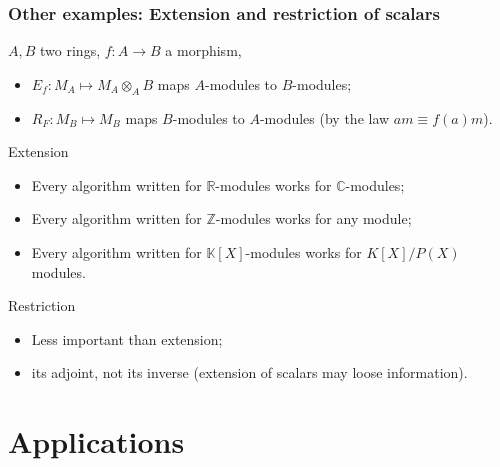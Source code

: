 \documentclass[10pt]{beamer}
\newcommand{\Z}{\mathbb{Z}}
\newcommand{\Complex}{\mathbb{C}}
\newcommand{\R}{\mathbb{R}}
\newcommand{\K}{\mathbb{K}}
\newcommand{\ra}{\rightarrow}
\begin{document}
\begin{frame}
  \frametitle{Other examples: Extension and restriction of scalars}

  \begin{block}{}
    $A,B$ two rings, $f:A\ra B$ a morphism,
    \begin{itemize}
    \item $E_f : M_A\mapsto M_A\otimes_AB$ maps $A$-modules to
      $B$-modules;
    \item $R_F : M_B\mapsto M_B$ maps $B$-modules to $A$-modules (by
      the law $am \equiv f(a)m$).
    \end{itemize}
  \end{block}

  \begin{block}{Extension}
    \begin{itemize}
    \item Every algorithm written for $\R$-modules works for
      $\Complex$-modules;
    \item Every algorithm written for $\Z$-modules works for any module;
    \item Every algorithm written for $\K[X]$-modules works for
      $K[X]/P(X)$ modules.
    \end{itemize}
  \end{block}

  \begin{block}{Restriction}
    \begin{itemize}
    \item Less important than extension;
    \item its \alert{adjoint}, not its inverse (extension of scalars
      may loose information).
    \end{itemize}
  \end{block}
\end{frame}


\section{Applications}
\end{document}
